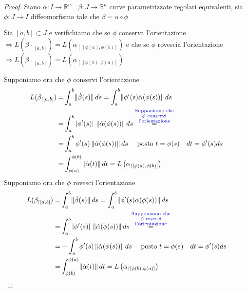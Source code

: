         \begin{proof}
        Siano $\alpha:I \to \mathbb{R}^n \quad \beta : J \to \mathbb{R}^n$ curve parametrizzate regolari equivalenti, sia $\phi : J \to I$ diffeomorfismo tale che $\beta = \alpha \circ \phi$

        Sia $[a,b] \subset J$ e verifichiamo che se $\phi$ conserva l'orientazione $\Rightarrow L \left(\beta_{\restriction{[a,b]}}\right)= L\left(\alpha_{\restriction{[\phi(a),\phi(b)]}}\right)$ e
        che se $\phi$ rovescia l'orientazione $\Rightarrow L \left(\beta_{\restriction{[a,b]}}\right)= L\left(\alpha_{\restriction{[\phi(b),\phi(a)]}}\right)$ 
        
        Supponiamo ora che $\phi$ conservi l'orientazione
        \begin{align*}
        L(\beta_{\restriction{[a,b]}}) =& \int_a^b \norm{\dot{\beta}(s)} \, ds = \int_a^b \norm{ \phi'(s) \dot{\alpha}(\phi(s))} \, ds \\
        =& \int_a^b \left|\phi'(s)\right| \, \norm{\dot{\alpha}(\phi(s))} \, ds \overset{\textcolor{blu}{\substack{\text{Supponiamo che} \\ \phi \text{ conservi} \\ \text{l'orientazione}}}}{=} \\
        =& \int_a^b  \phi'(s) \, \norm{\dot{\alpha}(\phi(s))} \, ds \quad \text{ posto } t=\phi(s) \quad dt= \phi'(s) ds \\
        =& \int_{\phi(a)}^{\phi(b)} \norm{\dot{\alpha} (t)} \, dt = L\left(\alpha_{\restriction{[\phi(a),\phi(b)]}}\right)
        \end{align*}
        Supponiamo ora che $\phi$ rovesci l'orientazione
        \begin{align*}
        L(\beta_{\restriction{[a,b]}}) =& \int_a^b \norm{\dot{\beta}(s)} \, ds = \int_a^b \norm{ \phi'(s) \dot{\alpha}(\phi(s))} \, ds \\
        =& \int_a^b \left|\phi'(s)\right| \, \norm{\dot{\alpha}(\phi(s))} \, ds \overset{\textcolor{blu}{\substack{\text{Supponiamo che} \\ \phi \text{ rovesci} \\ \text{l'orientazione}}}}{=} \\
        =& - \int_a^b  \phi'(s) \, \norm{\dot{\alpha}(\phi(s))} \, ds \quad \text{ posto } t=\phi(s) \quad dt= \phi'(s) ds \\
        =& \int_{\phi(b)}^{\phi(a)} \norm{\dot{\alpha} (t)} \, dt = L\left(\alpha_{\restriction{[\phi(b),\phi(a)]}}\right)
        \end{align*}
        \end{proof}
